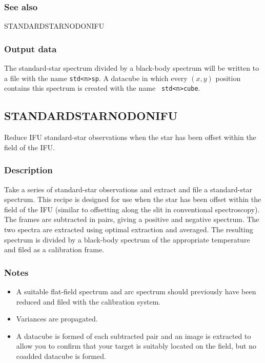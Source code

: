 \documentclass[twoside,11pt]{article}
\renewcommand{\_}{\texttt{\symbol{95}}}
\begin{document}
\subsubsection*{See also}

STANDARD\_STAR\_NOD\_ON\_IFU

\subsubsection*{Output data}

The standard-star spectrum divided by a black-body spectrum will be written to
a file with the name {\tt std\_<n>\_sp}. A datacube in which every
$(x,y)$ position contains this spectrum is created with the name {\tt
  std\_<n>\_cube}.

\clearpage



\subsection{STANDARD\_STAR\_NOD\_ON\_IFU}

Reduce IFU standard-star observations when the star
has been offset within the field of the IFU.

\subsubsection*{Description}

Take a series of standard-star observations and extract and file a
standard-star spectrum. This recipe is designed for use when the star
has been offset within the field of the IFU (similar to offsetting
along the slit in conventional spectroscopy). The frames are
subtracted in pairs, giving a positive and negative spectrum. The two
spectra are extracted using optimal extraction and averaged. The
resulting spectrum is divided by a black-body spectrum of the
appropriate temperature and filed as a calibration frame.

\subsubsection*{Notes}\begin{itemize}
\item 

A suitable flat-field spectrum and arc spectrum should previously have
been reduced and filed with the calibration system.

\item

  Variances are propagated.

\item 

A datacube is formed of each subtracted pair and an image is extracted
to allow you to confirm that your target is suitably located on the
field, but no coadded datacube is formed.

\end{itemize}
\end{document}
